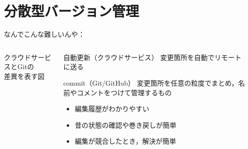 \documentclass[12pt,dvipdfmx,svgnames,uplatex,aspectratio=169]{beamer}
\begin{document}
\section{分散型バージョン管理}
\begin{frame}{なんでこんな難しいんや：\insertsection}
  \begin{columns}[c] %
    \begin{column}{0.5\textwidth}
      \begin{screen}
        クラウドサービスとGitの\\差異を表す図
      \end{screen}
    \end{column}
    \begin{column}{0.5\textwidth}
      \begin{block}{自動更新（クラウドサービス）}
        変更箇所を自動でリモートに送る
      \end{block}
      \begin{block}{commit（Git/GitHub）}
        変更箇所を任意の粒度でまとめ，名前やコメントをつけて管理するもの
        \begin{itemize}
          \item 編集履歴がわかりやすい
          \item 昔の状態の確認や巻き戻しが簡単
          \item 編集が競合したとき，解決が簡単
        \end{itemize}
      \end{block}
    \end{column}
  \end{columns}
\end{frame}
\end{document}
